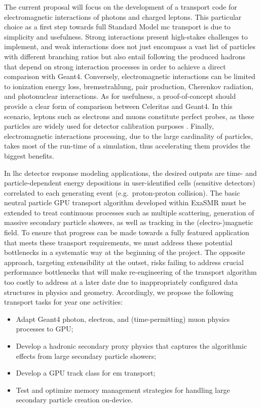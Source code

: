 \documentclass[10pt]{article}
\begin{document}
The current proposal will focus on the development of a transport code
for electromagnetic interactions of photons and charged leptons. This particular
choice as a first step towards full Standard Model \ac{mc} transport is due
to simplicity and usefulness. Strong interactions present high-stakes
challenges to implement, and weak interactions does not just encompass a vast
list of particles with different branching ratios but also entail following
the produced hadrons that depend on strong interaction processes in
order to achieve a direct comparison with Geant4. Conversely,
electromagnetic interactions can be limited to ionization energy loss,
bremsstrahlung, pair production, Cherenkov radiation, and photonuclear
interactions. As for usefulness, a proof-of-concept should provide a
clear form of comparison between Celeritas and Geant4. In this scenario,
leptons such as electrons and muons constitute perfect probes, as these
particles are widely used for detector calibration purposes 
\cite{atlas_calibration_e,atlas_calibration_mu}.  Finally, electromagnetic interactions processing, due to the large cardinality of particles, takes most of 
the run-time of a simulation, thus accelerating them provides the biggest benefits.

In \ac{lhc} detector response modeling applications, the desired outputs are
time- and particle-dependent energy depositions in user-identified cells
(sensitive detectors) correlated to each generating event
(e.g.~proton-proton collision). The basic neutral particle GPU transport
algorithm developed within ExaSMR must be extended to treat
continuous processes such as multiple scattering, generation of massive secondary
particle showers, as well as tracking in the (electro-)magnetic field. To ensure that progress can be made towards a fully featured application that meets these transport
requirements, we must address these potential bottlenecks in a
systematic way at the beginning of the project. The opposite approach, targeting extensibility at the outset, risks failing to
address crucial performance bottlenecks that will make
re-engineering of the transport algorithm too costly to address at a
later date due to inappropriately configured data structures in physics
and geometry. Accordingly, we propose the following transport tasks for
year one activities:
\begin{itemize}
 \itemsep2pt%
 \parskip0pt%
\item
  Adapt Geant4 photon, electron, and (time-permitting) muon physics processes to
  GPU;
\item
  Develop a hadronic secondary proxy physics that captures the
  algorithmic effects from large secondary particle showers;
\item
  Develop a GPU track class for \ac{em} transport;
\item
  Test and optimize memory management strategies for handling large
  secondary particle creation on-device.
\end{itemize}
\end{document}
